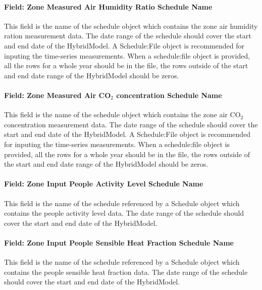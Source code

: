 \paragraph{Field: Zone Measured Air Humidity Ratio Schedule Name}\label{field-zone-measured-air-humidity-ratio-schedule-name-hm}
This field is the name of the schedule object which contains the zone air humidity ration measurement data. The date range of the schedule should cover the start and end date of the HybridModel. A Schedule:File object is recommended for inputing the time-series measurements. When a schedule:file object is provided, all the rows for a whole year should be in the file, the rows outside of the start and end date range of the HybridModel should be zeros.

\paragraph{Field: Zone Measured Air CO$_2$ concentration Schedule Name}\label{field-zone-measured-air-co2-concentration-schedule-name-hm}
This field is the name of the schedule object which contains the zone air CO$_2$ concentration measurement data. The date range of the schedule should cover the start and end date of the HybridModel. A Schedule:File object is recommended for inputing the time-series measurements. When a schedule:file object is provided, all the rows for a whole year should be in the file, the rows outside of the start and end date range of the HybridModel should be zeros.

\paragraph{Field: Zone Input People Activity Level Schedule Name}\label{field-zone-input-people-activity-schedule-name-hm}
This field is the name of the schedule referenced by a Schedule object which contains the people activity level data. The date range of the schedule should cover the start and end date of the HybridModel.

\paragraph{Field: Zone Input People Sensible Heat Fraction Schedule Name}\label{field-zone-input-people-sensible-heat-fraction-schedule-name-hm}
This field is the name of the schedule referenced by a Schedule object which contains the people sensible heat fraction data. The date range of the schedule should cover the start and end date of the HybridModel.

